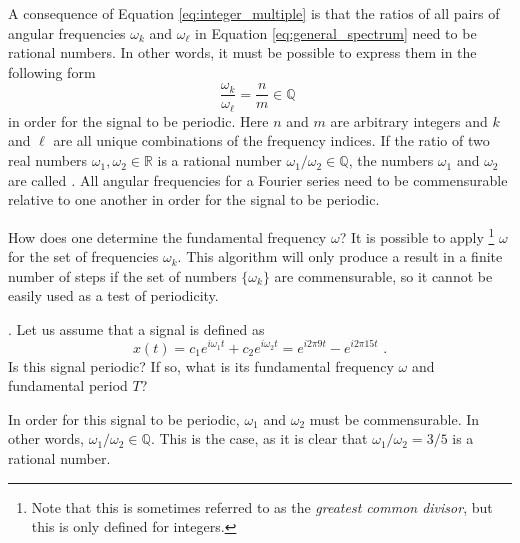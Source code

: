 A consequence of Equation \ref{eq:integer_multiple} is that the ratios of all pairs of angular
frequencies $\omega_k$ and $\omega_{\ell}$
in Equation \ref{eq:general_spectrum} need to be rational numbers. In other words, it must
be possible to express them in the following form
\begin{equation}
  \frac{\omega_k}{\omega_{\ell}} = \frac{n}{m} \in \mathbb{Q} \,\,
\end{equation}
in order for the signal to be periodic. Here $n$ and $m$ are arbitrary integers
and $k$ and $\ell$ are all unique combinations of the frequency indices.
If the ratio of two real numbers $\omega_1,\omega_2\in\mathbb{R}$ is a rational
number $\omega_1/\omega_2 \in \mathbb{Q}$, the numbers $\omega_1$ and
$\omega_2$ are called \emph{.}
All angular frequencies for a Fourier series need to be commensurable relative
to one another in order for the signal to be periodic.

How does one determine the fundamental frequency $\omega$? It is possible to
apply \emph{}\footnote{Note that
this is sometimes referred to as the \emph{greatest common divisor}, but this is only defined for 
integers.} $\omega$ for the set of frequencies $\omega_k$. This algorithm will
only produce a result in a finite number of steps if the set of numbers $\{\omega_k\}$ are
commensurable, so it cannot be easily used as a test of periodicity.

. Let us assume that a signal is defined as
\begin{equation}
  x(t) = c_1 e^{i \omega_1 t} + c_2 e^{i \omega_2 t} = e^{i 2\pi 9t}
  - e^{i 2\pi 15t} \,\,.
\end{equation}
Is this signal periodic? If so, what is its fundamental frequency $\omega$ and fundamental period $T$?

In order for this signal to be periodic, $\omega_1$ and $\omega_2$ must be commensurable.
In other words, $\omega_1/\omega_2 \in \mathbb{Q}$. This is the case, as it is clear
that $\omega_1/\omega_2 = 3/5$ is a rational number.


